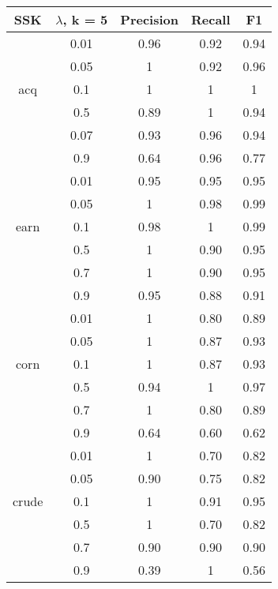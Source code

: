 \begin{tabular}{| c | c | c | c | c | }
	\hline SSK & $ \lambda  $, k = 5& Precision & Recall & F1   \\ \hline	
	
	& 0.01 & 0.96 & 0.92 & 0.94     \\ 
	& 0.05 & 1 & 0.92 & 0.96     \\ 
	acq & 0.1 & 1& 1 &  1    \\
	& 0.5 & 0.89 & 1 & 0.94     \\ 
	& 0.07 & 0.93 & 0.96 & 0.94     \\ 
	& 0.9 & 0.64 & 0.96 & 0.77     \\ \hline
	
	
	& 0.01 & 0.95 & 0.95 &  0.95    \\	
	& 0.05 & 1 & 0.98 &  0.99    \\ 
	earn & 0.1 & 0.98 & 1 &  0.99    \\ 
	& 0.5 & 1 & 0.90 &  0.95    \\ 
	& 0.7 & 1 & 0.90 &  0.95    \\
	& 0.9 & 0.95 & 0.88 &  0.91    \\\hline
	
	
	
	& 0.01 & 1 & 0.80 & 0.89     \\ 
	& 0.05 & 1 & 0.87 & 0.93     \\ 
	corn & 0.1 & 1 & 0.87 & 0.93     \\ 
	& 0.5 & 0.94 & 1 &  0.97   \\ 
	& 0.7 & 1 & 0.80 & 0.89     \\ 
	& 0.9 & 0.64 & 0.60 & 0.62     \\ \hline
	
	
	& 0.01 & 1 & 0.70 &  0.82    \\
	& 0.05 & 0.90 & 0.75 &  0.82    \\ 
	crude & 0.1 & 1 & 0.91 & 0.95     \\ 
	& 0.5 & 1 & 0.70 &  0.82    \\ 
	& 0.7 & 0.90 & 0.90 &  0.90    \\
	& 0.9 & 0.39 & 1 &  0.56    \\\hline
	
	
\end{tabular}



